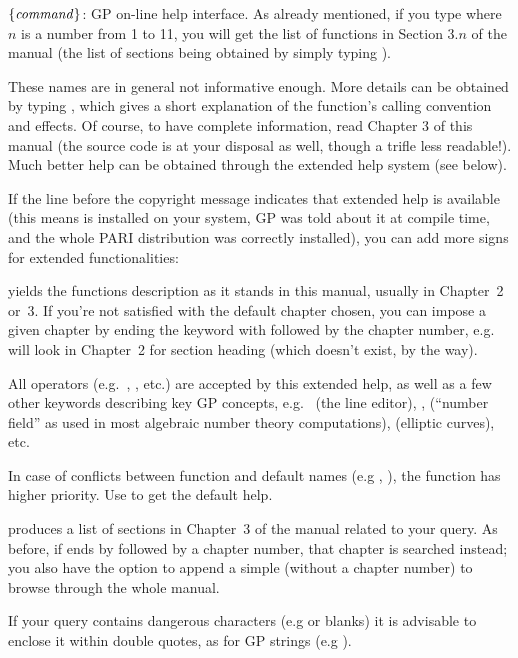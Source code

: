  $\{\hbox{\it command\/}\}$: GP on-line help interface.
As already mentioned, if you type  where $n$ is a number from 1
to 11, you will get the list of functions in Section $3.n$ of the manual
(the list of sections being obtained by simply typing ).
\label{se:exthelp}

These names are in general not informative enough. More details can be
obtained by typing , which gives a short explanation of
the function's calling convention and effects. Of course, to have complete
information, read Chapter 3 of this manual (the source code is at your
disposal as well, though a trifle less readable!). Much better help can be
obtained through the extended help system (see below).

\unix If the line before the copyright message indicates that extended help
is available (this means  is installed on your system, GP was
told about it at compile time, and the whole PARI distribution was
correctly installed), you can add more  signs for extended
functionalities:

 yields the functions description as it stands in this
manual, usually in Chapter~2 or~3. If you're not satisfied with the default
chapter chosen, you can impose a given chapter by ending the keyword with
 followed by the chapter number, e.g.~ will look in
Chapter~2 for section heading  (which doesn't exist, by the way).

All operators (e.g.~\kbd{+}, \kbd{\&\&}, etc.) are accepted by this
extended help, as well as a few other keywords describing key GP concepts,
e.g.~ (the line editor), ,  (``number
field'' as used in most algebraic number theory computations), 
(elliptic curves), etc.

In case of conflicts between function and default names (e.g ,
), the function has higher priority. Use  to get the default help.

 produces a list of sections in Chapter~3 of the
manual related to your query. As before, if  ends by 
followed by a chapter number, that chapter is searched instead; you also
have the option to append a simple  (without a chapter number) to
browse through the whole manual.

If your query contains dangerous characters (e.g  or blanks) it is
advisable to enclose it within double quotes, as for GP strings (e.g
).

